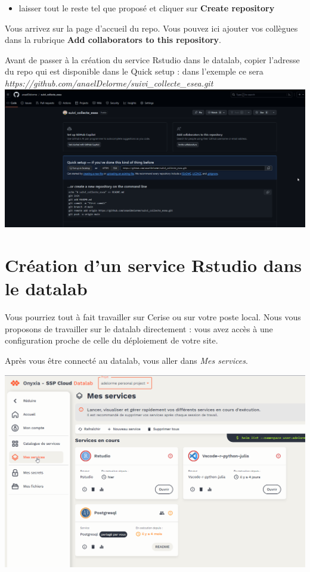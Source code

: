 \documentclass[
  letterpaper,
  DIV=11,
  numbers=noendperiod]{scrreprt}
\providecommand{\tightlist}{%
  \setlength{\itemsep}{0pt}\setlength{\parskip}{0pt}}\usepackage{longtable,booktabs,array}
\begin{document}
\begin{itemize}
\tightlist
\item
  laisser tout le reste tel que proposé et cliquer sur \textbf{Create
  repository}
\end{itemize}

Vous arrivez sur la page d'accueil du repo. Vous pouvez ici ajouter vos
collègues dans la rubrique \textbf{Add collaborators to this
repository}.

Avant de passer à la création du service Rstudio dans le datalab, copier
l'adresse du repo qui est disponible dans le Quick setup : dans
l'exemple ce sera
\emph{https://github.com/anaelDelorme/suivi\_collecte\_esea.git}
\includegraphics{./images/github_copy_link.png}

\hypertarget{cruxe9ation-dun-service-rstudio-dans-le-datalab}{%
\section{Création d'un service Rstudio dans le
datalab}\label{cruxe9ation-dun-service-rstudio-dans-le-datalab}}

Vous pourriez tout à fait travailler sur Cerise ou sur votre poste
local. Nous vous proposons de travailler sur le datalab directement :
vous avez accès à une configuration proche de celle du déploiement de
votre site.

Après vous être connecté au datalab, vous aller dans \emph{Mes
services}.

\includegraphics{./images/datalab_mes_services.png}
\end{document}
